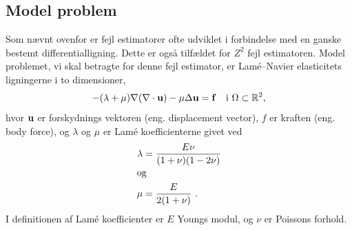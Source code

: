\subsection{Model problem} \label{modelafs}
Som nævnt ovenfor er fejl estimatorer ofte udviklet i forbindelse med
en ganske bestemt differentialligning. Dette er også tilfældet for
$Z^2$ fejl estimatoren. Model problemet, vi skal betragte for denne fejl
estimator, er Lam\'{e}--Navier elasticitets ligningerne i to dimensioner,
\begin{equation} \label{modpro}
  -(\lambda +\mu)\nabla (\nabla\cdot {\bf u}) - 
  \mu \Delta {\bf u} = {\bf f} \quad \text{i $\Omega\subset\mathbb{R}^2$,}
\end{equation}
hvor ${\bf u}$ er forskydnings vektoren (eng. displacement vector),
$f$ er kraften (eng. body force), og $\lambda$ og $\mu$ er Lam\'{e}
koefficienterne givet ved 
\begin{align}
 \lambda &= \frac{E\nu}{(1+\nu)(1-2\nu)} \\
\intertext{og}
  \mu &= \frac{E}{2(1+\nu)}\ .
\end{align}
I definitionen af Lam\'{e} koefficienter er $E$ Youngs modul, og $\nu$
er Poissons forhold.

